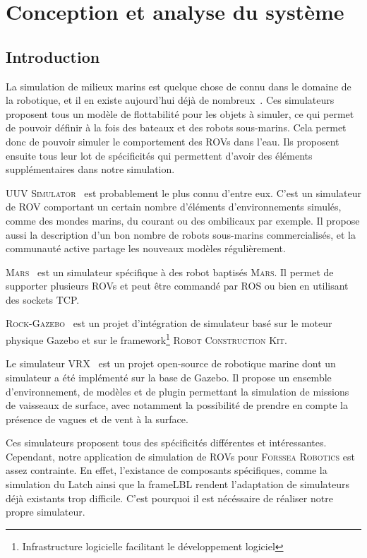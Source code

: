 \chapter{Conception et analyse du système}

    \section{Introduction}

        La simulation de milieux marins est quelque chose de connu dans le domaine de la robotique, et il en existe aujourd'hui déjà de nombreux~\cite{Manhaes_2016, bingham19toward, MARS, Rock}. Ces simulateurs proposent tous un modèle de flottabilité pour les objets à simuler, ce qui permet de pouvoir définir à la fois des bateaux et des robots sous-marins. Cela permet donc de pouvoir simuler le comportement des \gls{ROV}s dans l'eau. Ils proposent ensuite tous leur lot de spécificités qui permettent d'avoir des éléments supplémentaires dans notre simulation.
        
        \textsc{UUV Simulator}~\cite{Manhaes_2016} est probablement le plus connu d'entre eux. C'est un simulateur de \gls{ROV} comportant un certain nombre d'éléments d'environnements simulés, comme des mondes marins, du courant ou des ombilicaux par exemple. Il propose aussi la description d'un bon nombre de robots sous-marins commercialisés, et la communauté active partage les nouveaux modèles régulièrement.
        
        \textsc{Mars}~\cite{MARS} est un simulateur spécifique à des robot baptisés \textsc{Mars}. Il permet de supporter plusieurs \gls{ROV}s et peut être commandé par \gls{ROS} ou bien en utilisant des sockets TCP.
        
        \textsc{Rock-Gazebo}~\cite{Rock} est un projet d'intégration de simulateur basé sur le moteur physique \gls{Gazebo} et sur le framework\footnote{Infrastructure logicielle facilitant le développement logiciel} \textsc{Robot Construction Kit}.
        
        Le simulateur \textsc{VRX}~\cite{bingham19toward} est un projet open-source de robotique marine dont un simulateur a été implémenté sur la base de \gls{Gazebo}. Il propose un ensemble d'environnement, de modèles et de plugin permettant la simulation de missions de vaisseaux de surface, avec notamment la possibilité de prendre en compte la présence de vagues et de vent à la surface.

        Ces simulateurs proposent tous des spécificités différentes et intéressantes. Cependant, notre application de simulation de \gls{ROV}s pour \textsc{Forssea Robotics} est assez contrainte. En effet, l'existance de composants spécifiques, comme la simulation du \gls{Latch} ainsi que la \gls{frameLBL} rendent l'adaptation de simulateurs déjà existants trop difficile. C'est pourquoi il est nécéssaire de réaliser notre propre simulateur.

